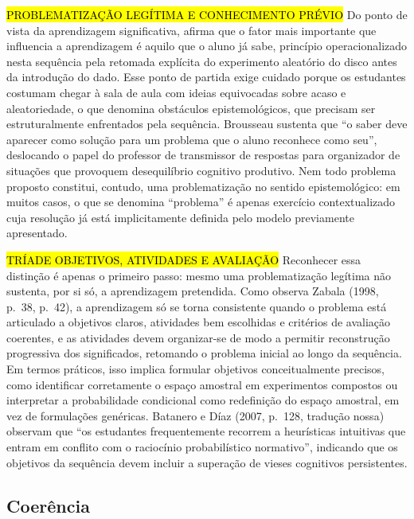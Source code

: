{\hl{PROBLEMATIZAÇÃO LEGÍTIMA E CONHECIMENTO PRÉVIO} Do ponto de vista da aprendizagem significativa,  afirma que o fator mais importante que influencia a aprendizagem é aquilo que o aluno já sabe, princípio operacionalizado nesta sequência pela retomada explícita do experimento aleatório do disco antes da introdução do dado. Esse ponto de partida exige cuidado porque os estudantes costumam chegar à sala de aula com ideias equivocadas sobre acaso e aleatoriedade, o que  denomina obstáculos epistemológicos, que precisam ser estruturalmente enfrentados pela sequência. Brousseau \cite[p.~22-23, tradução nossa]{brousseau1997} sustenta que ``o saber deve aparecer como solução para um problema que o aluno reconhece como seu'', deslocando o papel do professor de transmissor de respostas para organizador de situações que provoquem desequilíbrio cognitivo produtivo. Nem todo problema proposto constitui, contudo, uma problematização no sentido epistemológico: em muitos casos, o que se denomina ``problema'' é apenas exercício contextualizado cuja resolução já está implicitamente definida pelo modelo previamente apresentado.

\hl {TRÍADE OBJETIVOS, ATIVIDADES E AVALIAÇÃO} Reconhecer essa distinção é apenas o primeiro passo: mesmo uma problematização legítima não sustenta, por si só, a aprendizagem pretendida. Como observa Zabala (1998, p.~38, p.~42), a aprendizagem só se torna consistente quando o problema está articulado a objetivos claros, atividades bem escolhidas e critérios de avaliação coerentes, e as atividades devem organizar-se de modo a permitir reconstrução progressiva dos significados, retomando o problema inicial ao longo da sequência. Em termos práticos, isso implica formular objetivos conceitualmente precisos, como identificar corretamente o espaço amostral em experimentos compostos ou interpretar a probabilidade condicional como redefinição do espaço amostral, em vez de formulações genéricas. Batanero e Díaz (2007, p.~128, tradução nossa) observam que ``os estudantes frequentemente recorrem a heurísticas intuitivas que entram em conflito com o raciocínio probabilístico normativo'', indicando que os objetivos da sequência devem incluir a superação de vieses cognitivos persistentes.

\subsection{Coerência}

}
